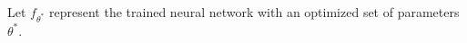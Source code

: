Let $f_{\theta^*}$ represent the trained neural network with an optimized set of parameters $\theta^*$. 